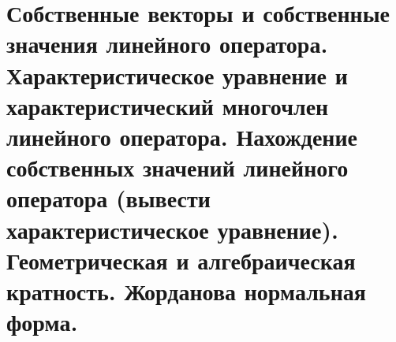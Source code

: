 \section{
    Собственные векторы и собственные значения линейного оператора. Характеристическое уравнение и характеристический многочлен линейного оператора. Нахождение собственных значений линейного оператора (вывести характеристическое уравнение). Геометрическая и алгебраическая кратность. Жорданова нормальная форма.
}






\newpage





\newpage





\newpage



